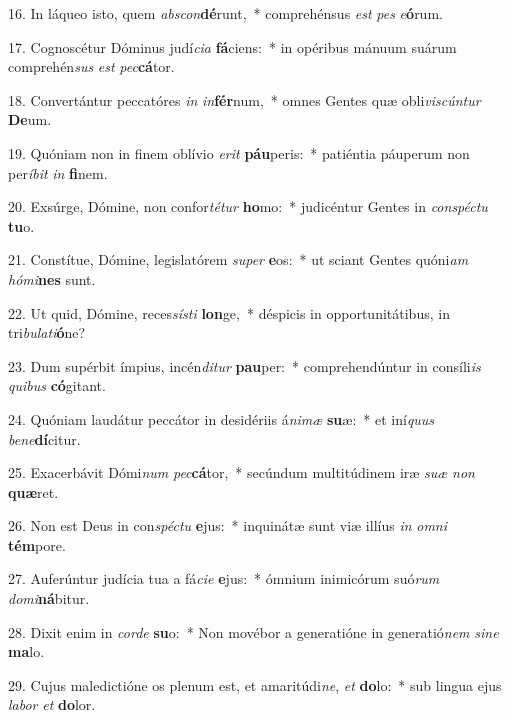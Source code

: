 16. In láqueo isto, quem \textit{abs}\textit{con}\textbf{dé}runt,~*  comprehénsus \textit{est} \textit{pes} \textit{e}\textbf{ó}rum.\

17. Cognoscétur Dóminus judí\textit{ci}\textit{a} \textbf{fá}ciens:~*  in opéribus mánuum suárum comprehén\textit{sus} \textit{est} \textit{pec}\textbf{cá}tor.\

18. Convertántur peccatóres \textit{in} \textit{in}\textbf{fér}num,~*  omnes Gentes quæ obli\textit{vis}\textit{cún}\textit{tur} \textbf{De}um.\

19. Quóniam non in finem oblívio \textit{e}\textit{rit} \textbf{páu}peris:~*  patiéntia páuperum non per\textit{í}\textit{bit} \textit{in} \textbf{fi}nem.\

20. Exsúrge, Dómine, non confor\textit{té}\textit{tur} \textbf{ho}mo:~*  judicéntur Gentes in \textit{con}\textit{spéc}\textit{tu} \textbf{tu}o.\

21. Constítue, Dómine, legislatórem \textit{su}\textit{per} \textbf{e}os:~*  ut sciant Gentes quóni\textit{am} \textit{hó}\textit{mi}\textbf{nes} sunt.\

22. Ut quid, Dómine, reces\textit{sís}\textit{ti} \textbf{lon}ge,~*  déspicis in opportunitátibus, in tri\textit{bu}\textit{la}\textit{ti}\textbf{ó}ne?\

23. Dum supérbit ímpius, incén\textit{di}\textit{tur} \textbf{pau}per:~*  comprehendúntur in consíli\textit{is} \textit{qui}\textit{bus} \textbf{có}gitant.\

24. Quóniam laudátur peccátor in desidériis á\textit{ni}\textit{mæ} \textbf{su}æ:~*  et iní\textit{quus} \textit{be}\textit{ne}\textbf{dí}citur.\

25. Exacerbávit Dómi\textit{num} \textit{pec}\textbf{cá}tor,~*  secúndum multitúdinem iræ \textit{su}\textit{æ} \textit{non} \textbf{quæ}ret.\

26. Non est Deus in con\textit{spéc}\textit{tu} \textbf{e}jus:~*  inquinátæ sunt viæ illíus \textit{in} \textit{om}\textit{ni} \textbf{tém}pore.\

27. Auferúntur judícia tua a fá\textit{ci}\textit{e} \textbf{e}jus:~*  ómnium inimicórum suó\textit{rum} \textit{do}\textit{mi}\textbf{ná}bitur.\

28. Dixit enim in \textit{cor}\textit{de} \textbf{su}o:~*  Non movébor a generatióne in generatió\textit{nem} \textit{si}\textit{ne} \textbf{ma}lo.\

29. Cujus maledictióne os plenum est, et amaritúdi\textit{ne}, \textit{et} \textbf{do}lo:~*  sub lingua ejus \textit{la}\textit{bor} \textit{et} \textbf{do}lor.\

